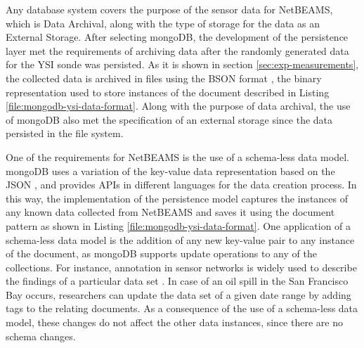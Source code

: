 Any database system covers the purpose of the sensor data for NetBEAMS, which
is Data Archival, along with the type of storage for the data as an External
Storage. After selecting mongoDB, the development of the persistence layer met
the requirements of archiving data after the randomly generated data for the
YSI sonde was persisted. As it is shown in section \ref{sec:exp-measurements},
the collected data is archived in files using the BSON format \cite{bson}, the
binary representation used to store instances of the document described in
Listing \ref{file:mongodb-ysi-data-format}. Along with the purpose of data
archival, the use of mongoDB also met the specification of an external storage
since the data persisted in the file system.

One of the requirements for NetBEAMS is the use of a schema-less data model.
mongoDB uses a variation of the key-value data representation based on the JSON
\cite{json}, and provides APIs in different languages for the data creation
process. In this way, the implementation of the persistence model captures the
instances of any known data collected from NetBEAMS and saves it using the
document pattern as shown in Listing \ref{file:mongodb-ysi-data-format}. One
application of a schema-less data model is the addition of any new key-value
pair to any instance of the document, as mongoDB supports update operations to
any of the collections. For instance, annotation in sensor networks is
widely used to describe the findings of a particular data set
\cite{sn-annotation-ex1, sn-annotation-ex2}. In case of an oil spill in the San
Francisco Bay occurs, researchers can update the data set of a given date range
by adding tags to the relating documents. As a consequence of the use of a
schema-less data model, these changes do not affect the other data instances,
since there are no schema changes.

